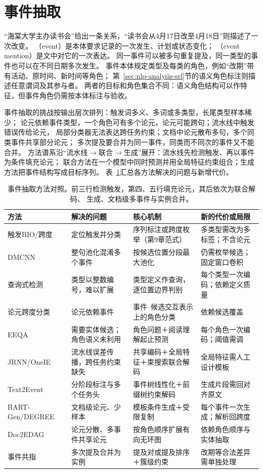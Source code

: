\section{事件抽取}
\label{sec:nlp-extraction-events}

“海棠大学主办读书会”给出一条关系，“读书会从4月17日改至4月18日”则描述了一次改变。
（event）是本体要求记录的一次发生、计划或状态变化；
（event mention）是文中对它的一次表达。
同一事件可以被多句重复提及，同一类型的事件也可以在不同日期多次发生。
事件本体规定类型及每类的角色，例如“改期”带有活动、原时间、新时间等角色；
第~\ref{sec:nlp-analysis-srl}节的语义角色标注则描述任意谓词及其参与者。
两者的目标和角色集合不同：语义角色结构可以作特征，但事件角色仍需按本体标注与验收。

事件抽取的挑战按输出层次排列：触发词多义、多词或多类型，长尾类型样本稀少；
论元依赖事件类型，一个角色可有多个论元，论元可能跨句；流水线中触发错误传给论元，
局部分类器无法表达跨任务约束；文档中论元散布多句，多个同类事件共享部分论元；
多次提及要合并为同一事件，同类而不同次的事件又不能合并。
方法谱系沿“流水线$\to$联合$\to$生成”展开：流水线先检测触发、再以事件为条件填充论元；
联合方法在一个模型中同时预测并用全局特征约束组合；生成方法把事件结构写成目标序列。
表~\ref{tab:nlp-extraction-event-methods}汇总各方法解决的问题与新增代价。

\begin{table}[htbp]
  \centering
  \small
  \begin{tabularx}{\linewidth}{@{}>{\raggedright\arraybackslash}p{22mm} XXX@{}}
    \toprule
    方法 & 解决的问题 & 核心机制 & 新的代价或局限\\
    \midrule
    触发BIO/跨度 & 定位触发并分类 & 序列标注或跨度枚举（第9章范式） & 多类型需改为多标签；不含论元 \\
    DMCNN & 整句池化混淆多个事件 & 按候选位置分段最大池化 & 仍需枚举候选；固定窗口卷积 \\
    查询式检测 & 类型以整数编号，难以扩展 & 类型定义作查询，逐位置边界判别 & 每个类型一次编码；依赖定义质量 \\
    论元跨度分类 & 论元依赖事件 & 事件--候选交互表示上的角色分类 & 依赖候选覆盖 \\
    EEQA & 需要实体候选；角色语义未利用 & 角色问题＋阅读理解起止预测 & 每个角色一次编码；阈值需调 \\
    JRNN/OneIE & 流水线误差传播，跨任务约束缺失 & 共享编码＋全局特征＋束搜索联合解码 & 全局特征需人工设计模板 \\
    Text2Event & 分阶段标注与多个任务头 & 事件树线性化＋前缀树约束解码 & 生成片段需回对齐原文 \\
    BART-Gen/DEGREE & 文档级论元、少样本 & 模板条件生成＋受限复制 & 每个事件一次生成；解析回跨度 \\
    Doc2EDAG & 论元分散、多事件共享论元 & 按角色顺序扩展有向无环图 & 依赖角色顺序与实体抽取 \\
    事件共指 & 多次提及合并为实例 & 提及对或提及排序＋簇级约束 & 改期等合法差异需单独处理 \\
    \bottomrule
  \end{tabularx}
  \caption{事件抽取方法对照。前三行检测触发，第四、五行填充论元，其后依次为联合解码、
  生成、文档级多事件与实例合并。}
  \label{tab:nlp-extraction-event-methods}
\end{table}

